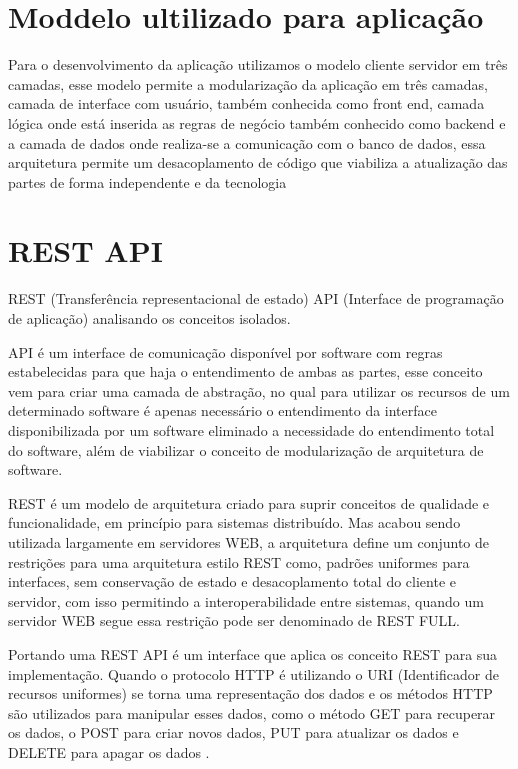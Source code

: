 \documentclass[../../layout.tex]{subfiles}
\begin{document}
\section{Moddelo ultilizado para aplicação}
\hspace*{3em}Para o desenvolvimento da aplicação  utilizamos o modelo cliente servidor em três camadas, esse modelo permite a modularização da aplicação  em três camadas,  camada de interface com usuário, também conhecida como front end, camada lógica onde está inserida as regras de negócio também conhecido como backend e a camada de dados  onde realiza-se a comunicação com o banco de dados, essa arquitetura permite um desacoplamento de código que viabiliza a atualização das partes de forma independente e da tecnologia \cite{3layers}
\section{REST API}
\hspace*{3em}REST (Transferência representacional de estado) API (Interface de programação de aplicação) analisando os conceitos isolados.\par
API é um interface de comunicação  disponível por software com regras estabelecidas para que haja o entendimento de ambas as partes, esse conceito vem para criar uma camada de abstração, no qual para utilizar os recursos de um determinado software é apenas necessário o entendimento da interface  disponibilizada por um software eliminado a  necessidade do entendimento total do software, além de viabilizar o conceito de modularização  de arquitetura de software.\par \cite{16}
REST é um modelo de arquitetura criado para suprir conceitos de qualidade e funcionalidade, em princípio para sistemas distribuído. Mas acabou sendo utilizada largamente em servidores WEB, a arquitetura define um conjunto de restrições para uma arquitetura estilo REST como, padrões uniformes para interfaces, sem conservação de estado e desacoplamento total do cliente e servidor, com isso permitindo a interoperabilidade entre sistemas, quando um servidor WEB segue essa restrição pode ser denominado de REST FULL.\par
Portando uma REST API é um interface que aplica os conceito REST para sua implementação\cite{19}. Quando o protocolo HTTP é utilizando o URI (Identificador de recursos uniformes) se torna uma representação dos dados e os métodos HTTP são utilizados para manipular esses dados, como o método GET para recuperar os dados, o POST para criar novos dados, PUT para atualizar os dados e DELETE para apagar os dados \cite{16}.
\end{document}
